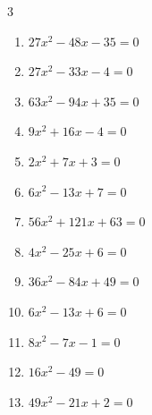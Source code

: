 \begin{multicols}{3}
\begin{enumerate}
  \item $27x^{2}-48x-35=0$


\columnbreak %

  \item $27x^{2}-33x-4=0$


  \item $63x^{2}-94x+35=0$


  \item $9x^{2}+16x-4=0$


  \item $2x^{2}+7x+3=0$


  \item $6x^{2}-13x+7=0$


  \item $56x^{2}+121x+63=0$


  \item $4x^{2}-25x+6=0$


  \item $36x^{2}-84x+49=0$


  \item $6x^{2}-13x+6=0$


  \item $8x^{2}-7x-1=0$


\columnbreak %

  \item $16x^{2}-49=0$


  \item $49x^{2}-21x+2=0$


\end{enumerate}
\end{multicols}
